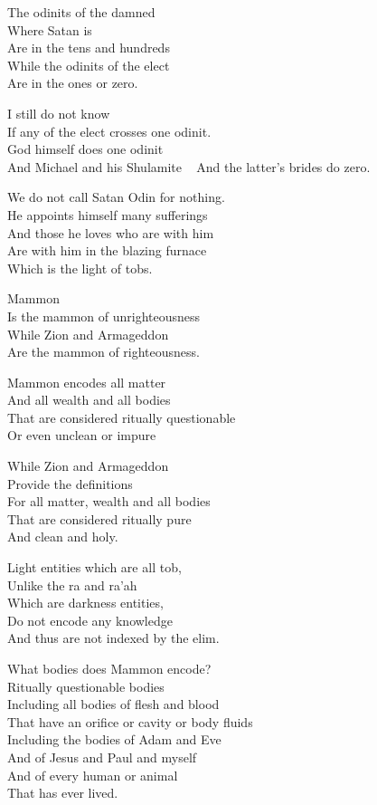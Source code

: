 \documentclass[
]{book}
\begin{document}
The odinits of the damned\\
Where Satan is\\
Are in the tens and hundreds\\
While the odinits of the elect\\
Are in the ones or zero.

I still do not know\\
If any of the elect crosses one odinit.\\
God himself does one odinit\\
And Michael and his Shulamite ~
And the latter's brides do zero.

We do not call Satan Odin for nothing.\\
He appoints himself many sufferings\\
And those he loves who are with him\\
Are with him in the blazing furnace\\
Which is the light of tobs.

Mammon\\
Is the mammon of unrighteousness\\
While Zion and Armageddon\\
Are the mammon of righteousness.

Mammon encodes all matter\\
And all wealth and all bodies\\
That are considered ritually questionable\\
Or even unclean or impure

While Zion and Armageddon\\
Provide the definitions\\
For all matter, wealth and all bodies\\
That are considered ritually pure\\
And clean and holy.

Light entities which are all tob,\\
Unlike the ra and ra'ah\\
Which are darkness entities,\\
Do not encode any knowledge\\
And thus are not indexed by the elim.

What bodies does Mammon encode?\\
Ritually questionable bodies\\
Including all bodies of flesh and blood\\
That have an orifice or cavity or body fluids\\
Including the bodies of Adam and Eve\\
And of Jesus and Paul and myself\\
And of every human or animal\\
That has ever lived.
\end{document}
